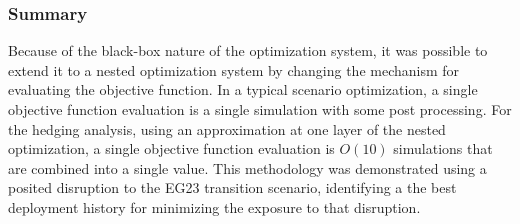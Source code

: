 \subsubsection{Summary}

Because of the black-box nature of the \Cyclus optimization system, it was
possible to extend it to a nested optimization system by changing the
mechanism for evaluating the objective function.  In a typical scenario
optimization, a single objective function evaluation is a single \Cyclus{}
simulation with some post processing.  For the hedging analysis, using an
approximation at one layer of the nested optimization, a single objective
function evaluation is $O(10)$ \Cyclus simulations that are combined into a
single value.  This methodology was demonstrated using a posited disruption
to the EG23 transition scenario, identifying a the best deployment history for
minimizing the exposure to that disruption.
